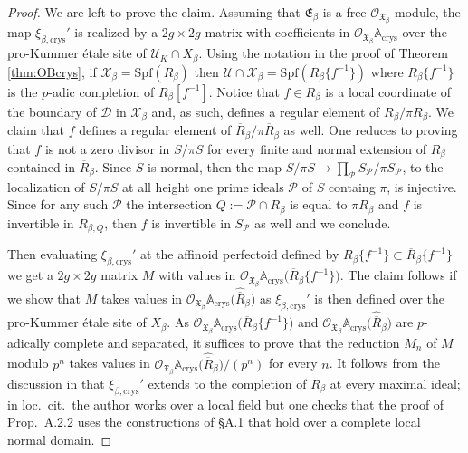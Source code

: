 \documentclass[asterisque,english]{smfart}
\begin{document}
\begin{proof}
We are left to prove the claim. Assuming that $\mathfrak{E}_\beta$ is a free $\mathcal{O}_{\mathfrak{X}_\beta}$-module, the map $\xi_{\beta,\mathrm{crys}}'$ is realized by a $2g \times 2g$-matrix with coefficients in  $ \mathcal{O}_{\mathfrak{X}_\beta}\mathbb{A}_{\mathrm{crys}}$ over the pro-Kummer \'etale site of $\mathcal{U}_K \cap X_{\beta} $. Using the notation in the proof of Theorem \ref{thm:OBcrys}, if  $\mathcal{X}_{\beta} =\mathrm{Spf}(R_\beta)$ then $\mathcal{U}\cap \mathcal{X}_{\beta}=\mathrm{Spf}(R_\beta\{f^{-1}\}) $ where   $R_\beta\{f^{-1}\}$ is the $p$-adic completion of $R_\beta[f^{-1}]$. Notice that $f\in R_\beta$ is a local coordinate of the boundary of $\mathcal{D}$ in $\mathcal{X}_\beta$ and, as such, defines a regular element of $R_\beta/\pi R_\beta$. We claim that $f$ defines a regular element of $\overline{R}_\beta/\pi \overline{R}_\beta$ as well. One reduces to proving that $f$ is not a zero divisor in $S/\pi S$ for every finite and normal extension of $R_\beta$ contained in $\overline{R}_\beta$. Since $S$ is normal, then the map $S/\pi S \to \prod_{\mathcal{P}} S_{\mathcal{P}}/\pi S_{\mathcal{P}}$, to the localization of $S/\pi S$ at all height one prime ideals $\mathcal{P}$ of $S$ containg $\pi$, is injective. Since for any such $\mathcal{P}$ the intersection $Q:=\mathcal{P} \cap R_\beta$ is equal to $\pi R_\beta$ and $f$ is invertible in $R_{\beta,Q}$, then $f$ is invertible in $S_\mathcal{P}$ as well  and we conclude.



Then evaluating $\xi_{\beta,\mathrm{crys}}'$ at the affinoid perfectoid defined by $R_\beta\{f^{-1}\}\subset \overline{R}_\beta\{f^{-1}\}$ we get a $2g \times 2g$ matrix $M$ with values in $ \mathcal{O}_{\mathfrak{X}_\beta}\mathbb{A}_{\mathrm{crys}}\bigl(\overline{R}_\beta\{f^{-1}\}\bigr)$.  The claim follows if we show that $M$ takes values in  $ \mathcal{O}_{\mathfrak{X}_\beta}\mathbb{A}_{\mathrm{crys}}\bigl(\widehat{\overline{R}}_\beta\bigr)$ as $\xi_{\beta,\mathrm{crys}}'$ is then defined over the pro-Kummer \'etale site of $X_{\beta} $. As $ \mathcal{O}_{\mathfrak{X}_\beta}\mathbb{A}_{\mathrm{crys}}\bigl(\overline{R}_\beta\{f^{-1}\}\bigr)$ and $ \mathcal{O}_{\mathfrak{X}_\beta}\mathbb{A}_{\mathrm{crys}}\bigl(\widehat{\overline{R}}_\beta\bigr)$ are $p$-adically complete and separated, it suffices to prove that the reduction $M_n$ of $M$ modulo $p^n$ takes values in $ \mathcal{O}_{\mathfrak{X}_\beta}\mathbb{A}_{\mathrm{crys}}\bigl(\widehat{\overline{R}}_\beta\bigr)/(p^n)$ for every $n$. It follows from the discussion in \cite[Prop. A.2.2 \& \S A.2.6]{MP} that $\xi_{\beta,\mathrm{crys}}'$ extends to the completion of $R_\beta$ at every maximal ideal; in loc.~cit.~the author works over a local field but one checks that the proof of Prop.~A.2.2 uses the constructions of \S A.1 that hold over a complete local normal domain. 




\end{proof}
\end{document}
